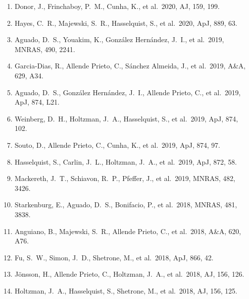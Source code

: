 \documentclass[12pt]{article}
\newcommand{\aj}{AJ}
\newcommand{\apj}{ApJ}
\newcommand{\apjl}{ApJ}
\newcommand{\mnras}{MNRAS}
\newcommand{\aap}{A\&A}
\begin{document}
\begin{enumerate}
\item Donor, J., Frinchaboy, P.~M., Cunha, K., et al.\ 2020, \aj, 159, 199. %

\item Hayes, C.~R., Majewski, S.~R., Hasselquist, S., et al.\ 2020, \apj, 889, 63. %

\item Aguado, D.~S., Youakim, K., Gonz{\'a}lez Hern{\'a}ndez, J.~I., et al.\ 2019, \mnras, 490, 2241. %


\item Garcia-Dias, R., Allende Prieto, C., S{\'a}nchez Almeida, J., et al.\ 2019, \aap, 629, A34. %

\item Aguado, D.~S., Gonz{\'a}lez Hern{\'a}ndez, J.~I., Allende Prieto, C., et al.\ 2019, \apjl, 874, L21. %

\item Weinberg, D.~H., Holtzman, J.~A., Hasselquist, S., et al.\ 2019, \apj, 874, 102. %

\item Souto, D., Allende Prieto, C., Cunha, K., et al.\ 2019, \apj, 874, 97. %

\item Hasselquist, S., Carlin, J.~L., Holtzman, J.~A., et al.\ 2019, \apj, 872, 58. %

\item Mackereth, J.~T., Schiavon, R.~P., Pfeffer, J., et al.\ 2019, \mnras, 482, 3426. %

\item Starkenburg, E., Aguado, D.~S., Bonifacio, P., et al.\ 2018, \mnras, 481, 3838. %

\item Anguiano, B., Majewski, S.~R., Allende Prieto, C., et al.\ 2018, \aap, 620, A76. %

\item Fu, S.~W., Simon, J.~D., Shetrone, M., et al.\ 2018, \apj, 866, 42. %

\item J{\"o}nsson, H., Allende Prieto, C., Holtzman, J.~A., et al.\ 2018, \aj, 156, 126. %

\item Holtzman, J.~A., Hasselquist, S., Shetrone, M., et al.\ 2018, \aj, 156, 125. %


\end{enumerate}
\end{document}
